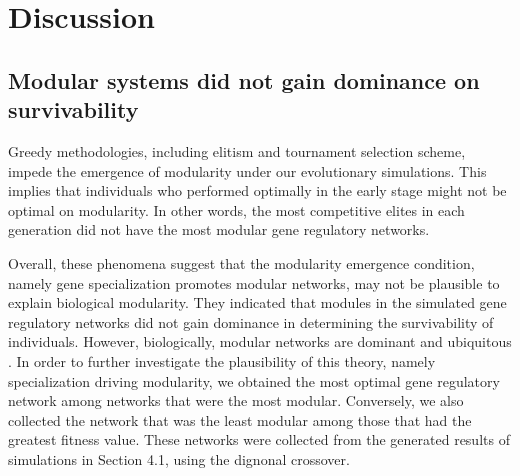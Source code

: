 \section{Discussion}
\subsection{Modular systems did not gain dominance on survivability}
Greedy methodologies, including elitism and tournament selection scheme, impede the emergence of modularity under our evolutionary simulations. This implies that individuals who performed optimally in the early stage might not be optimal on modularity. In other words, the most competitive elites in each generation did not have the most modular gene regulatory networks. 

Overall, these phenomena suggest that the modularity emergence condition, namely gene specialization promotes modular networks, may not be plausible to explain biological modularity. They indicated that modules in the simulated gene regulatory networks did not gain dominance in determining the survivability of individuals. However, biologically, modular networks are dominant and ubiquitous \cite{schlosser2004modularity}. In order to further investigate the plausibility of this theory, namely specialization driving modularity, we obtained the most optimal gene regulatory network among networks that were the most modular. Conversely, we also collected the network that was the least modular among those that had the greatest fitness value. These networks were collected from the generated results of simulations in Section 4.1, using the dignonal crossover.

